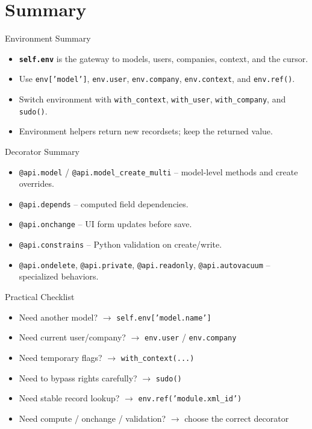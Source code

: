 \section{Summary}

\begin{frame}{Environment Summary}
	\begin{itemize}
		\item \textbf{\texttt{self.env}} is the gateway to models, users, companies, context, and the cursor.
		\item Use \texttt{env['model']}, \texttt{env.user}, \texttt{env.company}, \texttt{env.context}, and \texttt{env.ref()}.
		\item Switch environment with \texttt{with\_context}, \texttt{with\_user}, \texttt{with\_company}, and \texttt{sudo()}.
		\item Environment helpers return new recordsets; keep the returned value.
	\end{itemize}
\end{frame}

\begin{frame}{Decorator Summary}
	\begin{itemize}
		\item \texttt{@api.model} / \texttt{@api.model\_create\_multi} -- model-level methods and create overrides.
		\item \texttt{@api.depends} -- computed field dependencies.
		\item \texttt{@api.onchange} -- UI form updates before save.
		\item \texttt{@api.constrains} -- Python validation on create/write.
		\item \texttt{@api.ondelete}, \texttt{@api.private}, \texttt{@api.readonly}, \texttt{@api.autovacuum} -- specialized behaviors.
	\end{itemize}
\end{frame}

\begin{frame}{Practical Checklist}
	\begin{itemize}
		\item Need another model? $\rightarrow$ \texttt{self.env['model.name']}
		\item Need current user/company? $\rightarrow$ \texttt{env.user} / \texttt{env.company}
		\item Need temporary flags? $\rightarrow$ \texttt{with\_context(...)}
		\item Need to bypass rights carefully? $\rightarrow$ \texttt{sudo()}
		\item Need stable record lookup? $\rightarrow$ \texttt{env.ref('module.xml\_id')}
		\item Need compute / onchange / validation? $\rightarrow$ choose the correct decorator
	\end{itemize}
\end{frame}
